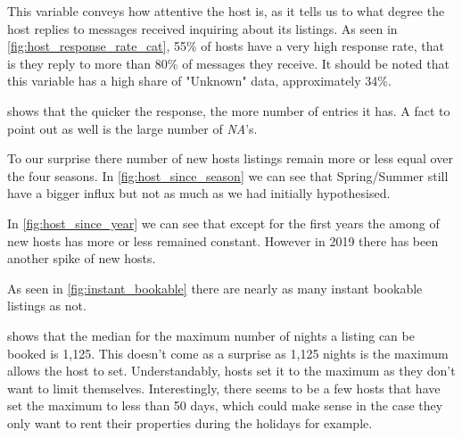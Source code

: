 
This variable conveys how attentive the host is, as it tells us to what degree
the host replies to messages received inquiring about its listings. As seen in
\cref{fig:host_response_rate_cat}, 55\% of hosts have a very high
response rate, that is they reply to more than 80\% of messages they receive.
It should be noted that this variable has a high share of "Unknown" 
data, approximately 34\%.



 shows that the quicker the response, the more
number of entries it has. A fact to point out as well is the large number of
\emph{NA}'s.



To our surprise there number of new hosts listings remain more or less equal over
the four seasons. In \cref{fig:host_since_season} we can see that Spring/Summer
still have a bigger influx but not as much as we had initially hypothesised.



In \cref{fig:host_since_year} we can see that except for the first years the
among of new hosts has more or less remained constant. However in 2019 there has
been another spike of new hosts.



As seen in \cref{fig:instant_bookable} there are nearly as many
instant bookable listings as not.



 shows that the median for
the maximum number of nights a listing can be booked is 1,125.
This doesn't come as a surprise as 1,125 nights is the maximum
\airbnb allows the host to set. Understandably, hosts set it to the
maximum as they don't want to limit themselves. Interestingly, 
there seems to be a few hosts that have set the maximum to less
than 50 days, which could make sense in the case they only want to
rent their properties during the holidays for example.




